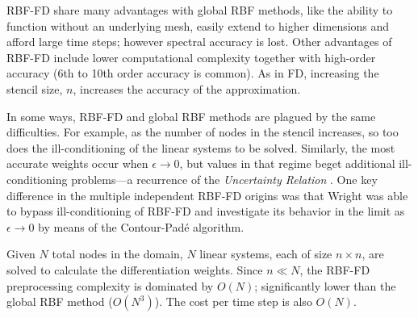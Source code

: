 \documentclass{report}
\begin{document}
{RBF-FD 
share many advantages with global RBF methods, 
like the ability to function without an underlying mesh, easily extend to higher dimensions and afford large time steps; however spectral accuracy is lost. 
Other advantages of RBF-FD 
include lower computational complexity together with high-order accuracy
(6th to 10th order accuracy is common). 
As in FD, increasing the stencil size, $n$, increases the accuracy of the approximation.

In some ways, RBF-FD and global RBF methods are plagued by the same difficulties. For example, as the number of nodes in the stencil increases, so too does the ill-conditioning of the linear systems to be solved. Similarly, the most accurate weights occur when $\epsilon \rightarrow 0$, but values in that regime beget additional ill-conditioning problems---a recurrence of the \emph{Uncertainty Relation} \cite{Schaback1995}. One key difference in the multiple independent RBF-FD origins was that Wright \cite{Wright2003} was able to bypass ill-conditioning of RBF-FD and investigate its behavior in the limit as $\epsilon \rightarrow 0$ by means of the Contour-Pad\'{e} algorithm. 

Given $N$ total nodes in the domain, $N$ linear systems, each of size $n \times n$, are solved to calculate the differentiation weights. Since $n \ll N$, the RBF-FD preprocessing complexity is dominated by $O(N)$; significantly lower than the global RBF method ($O(N^3)$). The cost per time step is also $O(N)$. 

}
\end{document}
